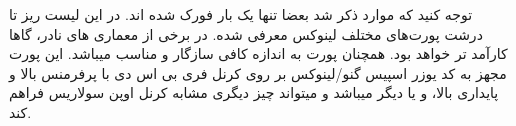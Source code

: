 توجه کنید که موارد ذکر شد بعضا تنها یک بار فورک شده اند. در این لیست ریز تا درشت
پورت‌های مختلف لینوکس معرفی شده. در برخی از معماری های نادر،
گاها کارآمد تر خواهد بود. همچنان پورت
به اندازه کافی سازگار و مناسب میباشد. این پورت مجهز به کد یوزر اسپیس گنو/لینوکس بر روی کرنل فری بی اس دی با پرفرمنس بالا و پایداری بالا،
و یا دیگر 
میباشد و میتواند چیز دیگری مشابه کرنل اوپن سولاریس فراهم کند.


